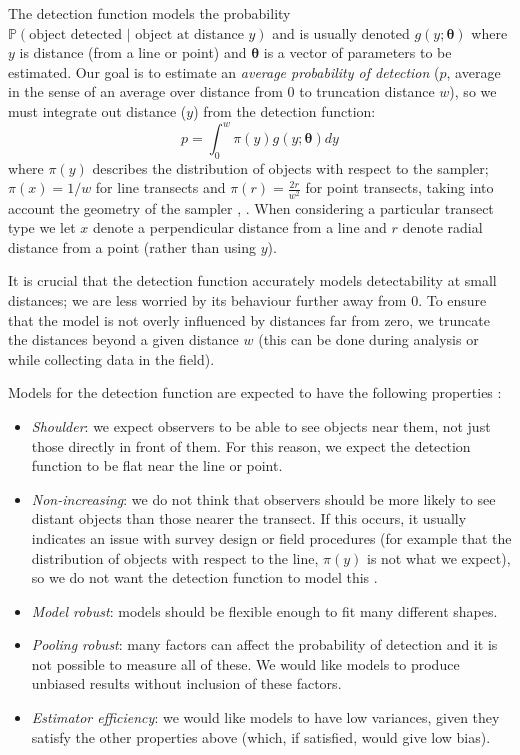 \documentclass[article]{jss}\usepackage[]{graphicx}\usepackage[]{color}
\begin{document}
The detection function models the probability $\mathbb{P}(\text{object detected } \vert \text{ object at distance } y)$ and is usually denoted $g(y; \boldsymbol{\theta})$ where $y$ is distance (from a line or point) and $\boldsymbol{\theta}$ is a vector of parameters to be estimated. Our goal is to estimate an \textit{average probability of detection} ($p$, average in the sense of an average over distance from $0$ to truncation distance $w$), so we must integrate out distance ($y$) from the detection function:
$$
p = \int_0^w \pi(y) g(y; \boldsymbol{\theta}) dy
$$
where $\pi(y)$ describes the distribution of objects with respect to the sampler; $\pi(x)=1/w$ for line transects and $\pi(r)=\frac{2r}{w^2}$ for point transects, taking into account the geometry of the sampler \citep[usually referred to as the \textit{probability density function of distances}][Chapter 3]{Buckland:2001vm}, . When considering a particular transect type we let $x$ denote a perpendicular distance from a line and $r$ denote radial distance from a point (rather than using $y$).

It is crucial that the detection function accurately models detectability at small distances; we are less worried by its behaviour further away from 0. To ensure that the model is not overly influenced by distances far from zero, we truncate the distances beyond a given distance $w$ (this can be done during analysis or while collecting data in the field).

Models for the detection function are expected to have the following properties \citep[][Chapter 5]{buckland2015distance}:

\begin{itemize}
\item \textit{Shoulder}: we expect observers to be able to see objects near them, not just those directly in front of them. For this reason, we expect the detection function to be flat near the line or point.
\item \textit{Non-increasing}: we do not think that observers should be more likely to see distant objects than those nearer the transect. If this occurs, it usually indicates an issue with survey design or field procedures (for example that the distribution of objects with respect to the line, $\pi(y)$ is not what we expect), so we do not want the detection function to model this \citep{Marques:2010he, Marques:2012fy, Miller:2015hw}.
\item \textit{Model robust}: models should be flexible enough to fit many different shapes.
\item \textit{Pooling robust}: many factors can affect the probability of detection and it is not possible to measure all of these. We would like models to produce unbiased results without inclusion of these factors.
\item \textit{Estimator efficiency}: we would like models to have low variances, given they satisfy the other properties above (which, if satisfied, would give low bias).
\end{itemize}
\end{document}

